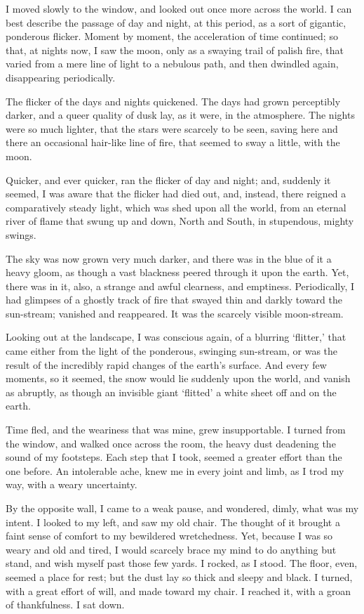 I moved slowly to the window, and looked out once more across the world. I can best describe the passage of day and night, at this period, as a sort of gigantic, ponderous flicker. Moment by moment, the acceleration of time continued; so that, at nights now, I saw the moon, only as a swaying trail of palish fire, that varied from a mere line of light to a nebulous path, and then dwindled again, disappearing periodically.

The flicker of the days and nights quickened. The days had grown perceptibly darker, and a queer quality of dusk lay, as it were, in the atmosphere. The nights were so much lighter, that the stars were scarcely to be seen, saving here and there an occasional hair-like line of fire, that seemed to sway a little, with the moon.

Quicker, and ever quicker, ran the flicker of day and night; and, suddenly it seemed, I was aware that the flicker had died out, and, instead, there reigned a comparatively steady light, which was shed upon all the world, from an eternal river of flame that swung up and down, North and South, in stupendous, mighty swings.

The sky was now grown very much darker, and there was in the blue of it a heavy gloom, as though a vast blackness peered through it upon the earth. Yet, there was in it, also, a strange and awful clearness, and emptiness. Periodically, I had glimpses of a ghostly track of fire that swayed thin and darkly toward the sun-stream; vanished and reappeared. It was the scarcely visible moon-stream.

Looking out at the landscape, I was conscious again, of a blurring ‘flitter,’ that came either from the light of the ponderous, swinging sun-stream, or was the result of the incredibly rapid changes of the earth’s surface. And every few moments, so it seemed, the snow would lie suddenly upon the world, and vanish as abruptly, as though an invisible giant ‘flitted’ a white sheet off and on the earth.

Time fled, and the weariness that was mine, grew insupportable. I turned from the window, and walked once across the room, the heavy dust deadening the sound of my footsteps. Each step that I took, seemed a greater effort than the one before. An intolerable ache, knew me in every joint and limb, as I trod my way, with a weary uncertainty.

By the opposite wall, I came to a weak pause, and wondered, dimly, what was my intent. I looked to my left, and saw my old chair. The thought of it brought a faint sense of comfort to my bewildered wretchedness. Yet, because I was so weary and old and tired, I would scarcely brace my mind to do anything but stand, and wish myself past those few yards. I rocked, as I stood. The floor, even, seemed a place for rest; but the dust lay so thick and sleepy and black. I turned, with a great effort of will, and made toward my chair. I reached it, with a groan of thankfulness. I sat down.

